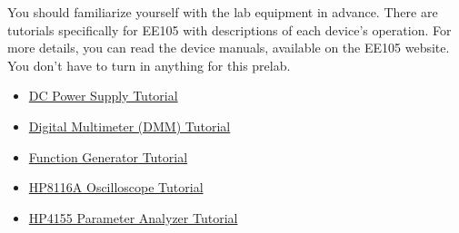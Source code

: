 \documentclass{article}
\begin{document}
\thispagestyle{plain}


You should familiarize yourself with the lab equipment in advance. There are tutorials specifically for EE105 with descriptions of each device's operation. For more details, you can read the device manuals, available on the EE105 website. You don't have to turn in anything for this prelab.

\begin{itemize}
\item \href{\baseurl/tutorials/HP6235A_Tutorial.pdf}{DC Power Supply Tutorial}
\item \href{\baseurl/tutorials/HP34401A_Tutorial.pdf}{Digital Multimeter (DMM) Tutorial}
\item \href{\baseurl/tutorials/HP8116A_Tutorial.pdf}{Function Generator Tutorial}
\item \href{\baseurl/tutorials/HP54615B_Tutorial.pdf}{HP8116A Oscilloscope Tutorial}
\item \href{\baseurl/tutorials/HP4155_Tutorial.pdf}{HP4155 Parameter Analyzer Tutorial}
\end{itemize}
\end{document}
